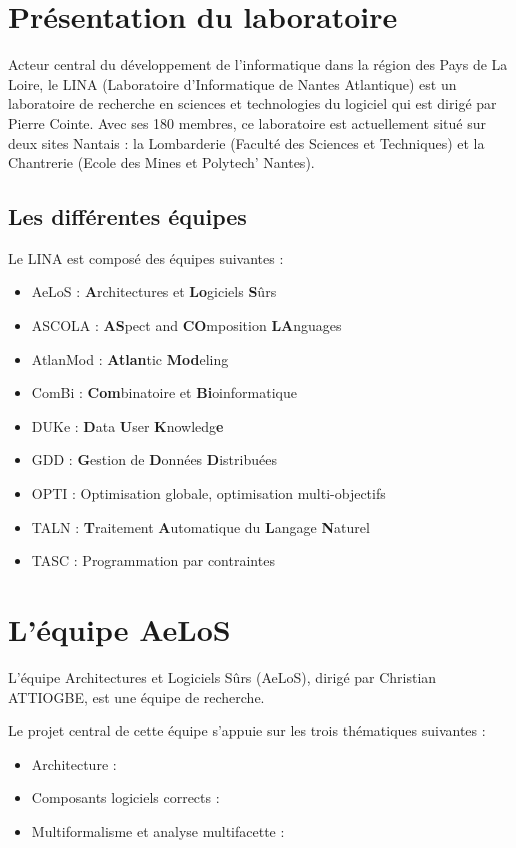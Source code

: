 \documentclass[12pt,a4paper]{report}
\begin{document}
\chapter{Présentation du laboratoire}
Acteur central du développement de l'informatique dans la région des Pays de La Loire, le LINA (Laboratoire d'Informatique de Nantes Atlantique) est un laboratoire de recherche en sciences et technologies du logiciel qui est dirigé par Pierre Cointe. Avec ses 180 membres, ce laboratoire est actuellement situé sur deux sites Nantais : la Lombarderie (Faculté des Sciences et Techniques) et la Chantrerie (Ecole des Mines et Polytech' Nantes).


\section{Les différentes équipes}
Le LINA est composé des équipes suivantes : 
\begin{itemize}
  \item AeLoS : \textbf{A}rchitectures et \textbf{Lo}giciels \textbf{S}ûrs
  \item ASCOLA : \textbf{AS}pect and \textbf{CO}mposition \textbf{LA}nguages
  \item AtlanMod : \textbf{Atlan}tic \textbf{Mod}eling 
  \item ComBi : \textbf{Com}binatoire et \textbf{Bi}oinformatique
  \item DUKe : \textbf{D}ata \textbf{U}ser \textbf{K}nowledg\textbf{e}
  \item GDD : \textbf{G}estion de \textbf{D}onnées \textbf{D}istribuées
  \item OPTI : Optimisation globale, optimisation multi-objectifs
  \item TALN : \textbf{T}raitement \textbf{A}utomatique du \textbf{L}angage \textbf{N}aturel
  \item TASC : Programmation par contraintes
\end{itemize}

\chapter{L'équipe AeLoS}	

L'équipe Architectures et Logiciels Sûrs (AeLoS), dirigé par Christian ATTIOGBE, est une équipe 
de recherche.

Le projet central de cette équipe s'appuie sur les trois thématiques suivantes :
\begin{itemize}[label=$\circ$]
  \item Architecture : 
  \item Composants logiciels corrects : 
  \item Multiformalisme et analyse multifacette : 
\end{itemize}
\end{document}
